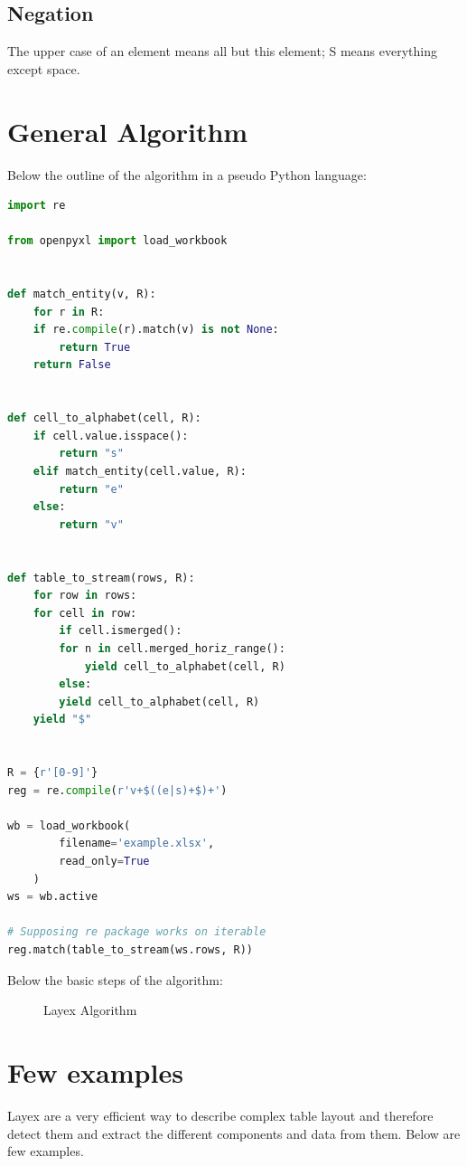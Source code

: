 \documentclass{article}
\begin{document}
\subsection{Negation}
The upper case of an element means all but this element; S means everything except space.

\section{General Algorithm}
Below the outline of the algorithm in a pseudo Python language:
\begin{lstlisting}[language=Python, caption=Layex Algorithm]
import re

from openpyxl import load_workbook


def match_entity(v, R):
    for r in R:
    if re.compile(r).match(v) is not None:
        return True
    return False


def cell_to_alphabet(cell, R):
    if cell.value.isspace():
        return "s"
    elif match_entity(cell.value, R):
        return "e"
    else:
        return "v"


def table_to_stream(rows, R):
    for row in rows:
    for cell in row:
        if cell.ismerged():
        for n in cell.merged_horiz_range():
            yield cell_to_alphabet(cell, R)
        else:
        yield cell_to_alphabet(cell, R)
    yield "$"


R = {r'[0-9]'}
reg = re.compile(r'v+$((e|s)+$)+')

wb = load_workbook(
        filename='example.xlsx',
        read_only=True
    )
ws = wb.active

# Supposing re package works on iterable
reg.match(table_to_stream(ws.rows, R))
\end{lstlisting}
Below the basic steps of the algorithm:
\begin{figure}[H]
\caption{Layex Algorithm}

\end{figure}

\section{Few examples}
Layex are a very efficient way to describe complex table layout and therefore detect them and extract the different
components and data from them. Below are few examples.
\end{document}
